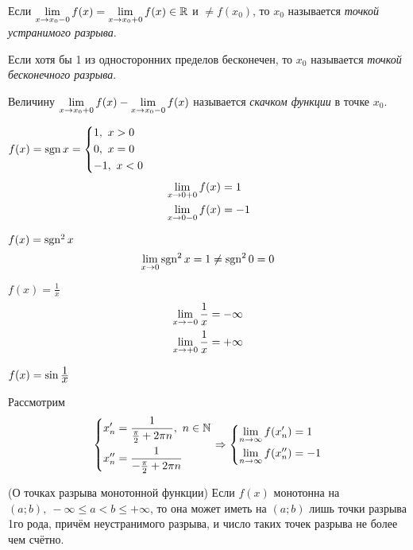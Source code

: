 \begin{definition}
	Если $\lim\limits_{x \to x_0-0} f(x) = \lim\limits_{x \to x_0+0} f(x) \in \mathbb{R}$ и $\neq f(x_0)$, то $x_0$ называется \textit{точкой устранимого разрыва}.
\end{definition}

\begin{definition}
	Если хотя бы 1 из односторонних пределов бесконечен, то $x_0$ называется \textit{точкой бесконечного разрыва}.
\end{definition}

\begin{definition}
	Величину $\lim\limits_{x \to x_0+0} f(x) - \lim\limits_{x \to x_0-0} f(x)$ называется \textit{скачком функции} в точке $x_0$.
\end{definition}

\begin{example}
	$f(x) = \operatorname{sgn} x = \left\{\begin{aligned}&{1,\ x > 0} \\ &{0,\ x = 0} \\ &{-1,\ x < 0}\end{aligned}\right.$
	\begin{align*}
		&\lim\limits_{x \to 0 + 0} f(x) = 1
		\\
		&\lim\limits_{x \to 0 - 0} f(x) = -1
	\end{align*}
\end{example}

\begin{example}
	$f(x) = \operatorname{sgn}^2 x$
	$$
		\lim\limits_{x \to 0} \operatorname{sgn}^2 x = 1 \neq \operatorname{sgn}^2 0 = 0
	$$
\end{example}

\begin{example}
	$f(x) = \frac{1}{x}$
	\begin{align*}
		\lim\limits_{x \to -0} \frac{\displaystyle 1}{\displaystyle x} = -\infty
		\\
		\lim\limits_{x \to +0} \frac{\displaystyle 1}{\displaystyle x} = +\infty
	\end{align*}
\end{example}

\begin{example}
	$f(x) = \sin \frac{\displaystyle 1}{\displaystyle x}$
	
	Рассмотрим
	$$
		\left\{\begin{aligned}
		&{x'_n = \frac{1}{\frac{\pi}{2} + 2\pi n},\ n \in \mathbb{N}}
		\\
		&{x''_n = \frac{1}{-\frac{\pi}{2} + 2\pi n}}
		\end{aligned}\right.
		\Rightarrow
		\left\{\begin{aligned}
		&{\lim\limits_{n \to \infty} f(x'_n) = 1}
		\\
		&{\lim\limits_{n \to \infty} f(x''_n) = -1}
		\end{aligned}\right.
	$$
\end{example}

\begin{theorem} (О точках разрыва монотонной функции)
	Если $f(x)$ монотонна на $(a; b),\ -\infty \le a < b \le +\infty$, то она может иметь на $(a; b)$ лишь точки разрыва 1го рода, причём неустранимого разрыва, и число таких точек разрыва не более чем счётно.
\end{theorem}

